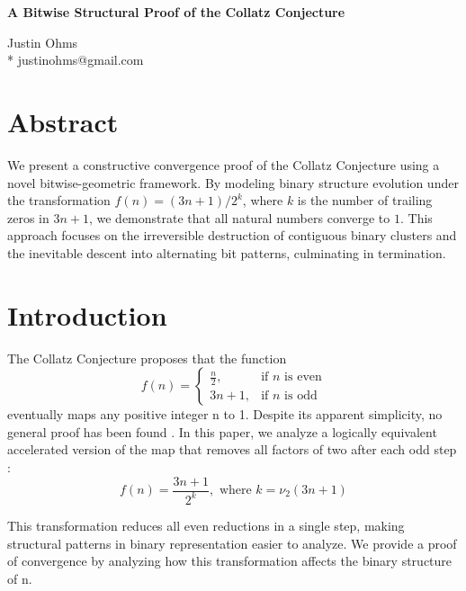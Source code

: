 \documentclass[10pt,letterpaper]{article}
\begin{document}
\vspace*{0.35in}

\begin{flushleft}
{\Large
\textbf{A Bitwise Structural Proof of the Collatz Conjecture}
}
\bigskip

Justin Ohms\\
* justinohms@gmail.com

\end{flushleft}

\section*{Abstract}
We present a constructive convergence proof of the Collatz Conjecture using a novel bitwise-geometric framework. By modeling binary structure evolution under the transformation $f(n) = (3n + 1)/2^k$, where $k$ is the number of trailing zeros in $3n + 1$, we demonstrate that all natural numbers converge to $1$. This approach focuses on the irreversible destruction of contiguous binary clusters and the inevitable descent into alternating bit patterns, culminating in termination.

\linenumbers

\section{Introduction}
The Collatz Conjecture proposes that the function
\begin{equation}
f(n) = \begin{cases} \frac{n}{2}, & \text{if } n \text{ is even} \\ 3n + 1, & \text{if } n \text{ is odd} \end{cases}
\end{equation}
eventually maps any positive integer n to 1. Despite its apparent simplicity, no general proof has been found \cite{Lagarias1985}. In this paper, we analyze a logically equivalent accelerated version of the map that removes all factors of two after each odd step \cite{Terras1976}: 
\begin{equation} f(n) = \frac{3n + 1}{2^k}, \text{ where } k = \nu_2(3n + 1) \end{equation}

This transformation reduces all even reductions in a single step, making structural patterns in binary representation easier to analyze. We provide a proof of convergence by analyzing how this transformation affects the binary structure of n.
\end{document}
